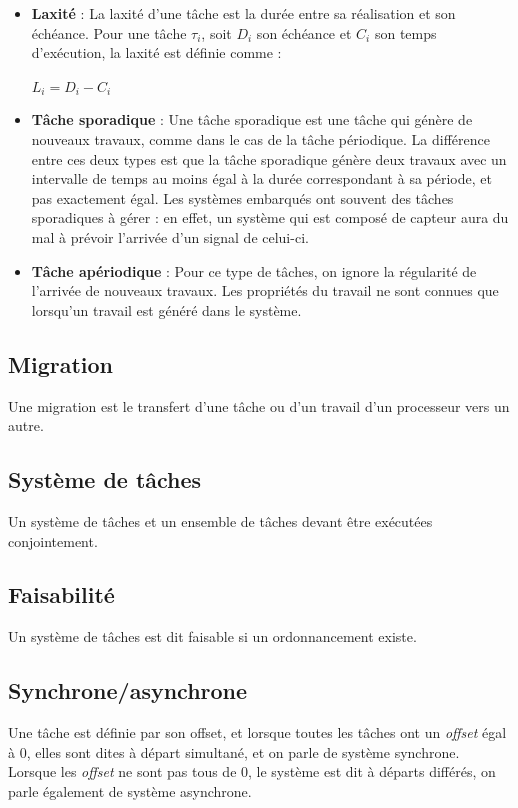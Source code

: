 \documentclass[11pt,a4paper,oneside]{report}
\begin{document}
\begin{itemize}
		\item \textbf{Laxité} : La laxité d'une tâche est la durée entre sa réalisation et son échéance. 
		Pour une tâche $\tau_i$, soit $D_i$ son échéance et $C_i$ son temps d'exécution, la laxité est définie comme :
		\vspace{-0.5cm}
		\begin{center}
			$L_i = D_i - C_i$
		\end{center}
		
		\item \textbf{Tâche sporadique} : Une tâche sporadique est une tâche qui génère de nouveaux travaux, 
		comme dans le cas de la tâche périodique. 
		La différence entre ces deux types est que la tâche sporadique 
		génère deux travaux avec un intervalle de temps au moins égal à la durée correspondant à sa période, 
		et pas exactement égal. Les systèmes embarqués ont souvent des tâches sporadiques à gérer : 
		en effet, un système qui est composé de capteur aura du mal à prévoir l'arrivée d'un signal de 
		celui-ci. 
		
		\item \textbf{Tâche apériodique} : Pour ce type de tâches, on ignore la régularité de 
		l'arrivée de nouveaux travaux. Les propriétés du travail ne sont connues que lorsqu'un travail est 
		généré dans le système.
		
	\end{itemize}
	
	\subsection{Migration}\label{migration}
	Une migration est le transfert d'une tâche ou d'un travail d’un processeur vers un autre.
	
	\subsection{Système de tâches}
	Un système de tâches et un ensemble de tâches devant être exécutées conjointement. 
	
	\subsection{Faisabilité}
	Un système de tâches est dit faisable si un ordonnancement existe.
	
	\subsection{Synchrone/asynchrone}
	Une tâche est définie par son offset, et lorsque toutes les tâches ont un \textit{offset} égal à 0, 
	elles sont dites \og à départ simultané\fg, et on parle de système synchrone. 
	Lorsque les \textit{offset} ne sont pas tous de 0, le système est dit à départs \og différés\fg{}, 
	on parle également de système asynchrone.
	
\end{document}
